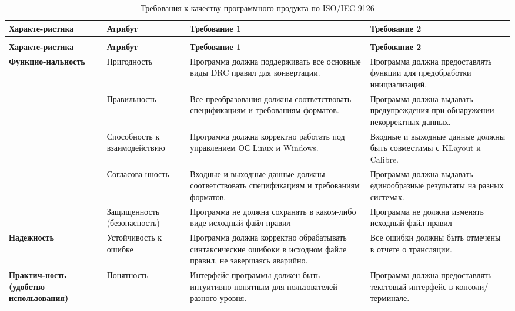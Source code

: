 \begin{longtable}{|p{3cm}|p{3cm}|p{5cm}|p{5cm}|}
	\caption{Требования к качеству программного продукта
		по ISO/IEC 9126} \label{table} \\
	\hline
	\textbf{Характе-ристика}
	& \textbf{Атрибут}
	& \textbf{Требование 1}
	& \textbf{Требование 2} \\
	\hline
	\endfirsthead

	\conttable{table} \\
	\hline
	\textbf{Характе-ристика}
	& \textbf{Атрибут}
	& \textbf{Требование 1}
	& \textbf{Требование 2} \\
	\hline
	\endhead

	\textbf{Функцио-нальность}
	& Пригодность
	& Программа должна поддерживать
	все основные виды DRC правил для конвертации.
	& Программа должна предоставлять функции
	для предобработки инициализаций. \\ \hline

	& Правильность
	& Все преобразования должны соответствовать спецификациям
	и требованиям форматов.
	& Программа должна выдавать предупреждения
	при обнаружении некорректных данных. \\ \hline

	& Способность к взаимодействию
	& Программа должна корректно работать
	под управлением ОС Linux и Windows.
	& Входные и выходные данные должны быть совместимы
	с KLayout и Calibre. \\ \hline

	& Согласова-нность
	& Входные и выходные данные должны соответствовать спецификациям
	и требованиям форматов.
	& Программа должна выдавать единообразные результаты
	на разных системах. \\ \hline

	& Защищенность (безопасность)
	& Программа не должна сохранять в каком-либо виде исходный файл правил
	& Программа не должна изменять исходный файл правил \\ \hline

	\textbf{Надежность}
	& Устойчивость к ошибке
	& Программа должна корректно обрабатывать синтаксические ошибоки
	в исходном файле правил, не завершаясь аварийно.
	& Все ошибки должны быть отмечены в отчете о трансляции. \\ \hline

	\textbf{Практич-ность (удобство использования)}
	& Понятность
	& Интерфейс программы должен быть интуитивно понятным
	для пользователей разного уровня.
	& Программа должна предоставлять текстовый интерфейс
	в консоли/терминале. \\ \hline


\end{longtable}
